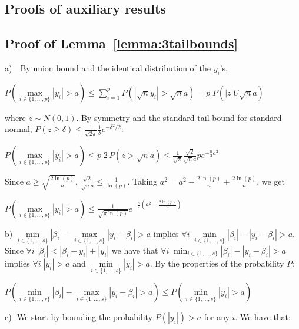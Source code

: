 \documentclass[aos]{imsart}
\theoremstyle{plain}
\begin{document}
\begin{supplement}
\section{Proofs of auxiliary results}\label{sec:proofauxi}

\subsection{Proof of Lemma~\ref{lemma:3tailbounds}}

	a) \,\, By union bound and the identical distribution of the $y_i$'s,
\begin{center}
    $P\left(\underset{i\in\{1,\ldots,p\}}{\max}|y_i|> a \right)     \leq \sum_{i=1}^{p}{ P\left(|\sqrt{n}y_i|>\sqrt{n}a \right)}
    = p\; P\left(|z|U\sqrt{n}a\right)$
\end{center}
    where $z\sim N(0,1)$. 
    By symmetry and the standard tail bound for standard normal, $P(z \geq \delta) \leq \frac{1}{\sqrt{2\pi}} \frac{1}{\delta} e^{-\delta^{2} / 2}$:
\begin{center}
  $P\left(\underset{i\in\{1,\ldots,p\}}{\max}|y_i|> a \right) 
     \leq  p\; 2 \, P\left(z>\sqrt{n}a\right) \leq \frac{1}{\sqrt{\pi}}\frac{\sqrt{2}}{\sqrt{n}a}p e^{-\frac{n}{2} a^{2}}$
\end{center}
Since $a \geq \sqrt{\frac{2\ln(p)}{n}}$, $\frac{\sqrt{2}}{\sqrt{n}a}\leq \frac{1}{\ln(p)}$. Taking $a^2=a^2-\frac{2\ln(p)}{n}+\frac{2\ln(p)}{n}$, we get \begin{center}
$ P\left(\underset{i\in\{1,\ldots,p\}}{\max}|y_i|> a \right) \leq \frac{1}{\sqrt{\pi\ln(p)}} e^{-\frac{n}{2} \left(a^{2}-\frac{2\ln(p)}{n}\right)}$ \\\end{center}
b) $ \underset{i \in \{1,\ldots,s\}}{\min}|\beta_i|- \underset{i \in \{1,\ldots,s\}}{\max}|y_i-\beta_i| > a$ implies $\forall i \; \underset{i \in \{1,\ldots,s\}}{\min}|\beta_i| - |y_i-\beta_i| > a $. Since $\forall i \; |\beta_i|< |\beta_i-y_i|+|y_i|$ we have that $ \forall i \; \min_{i \in \{1,\ldots,s\}}|\beta_i| - |y_i-\beta_i| > a$ implies $\forall i \; |y_i| > a $ and $ \underset{i \in \{1,\ldots,s\}}{\min}|y_i| > a$. By the properties of the probability $P$: 
\begin{center}$ P\left(\underset{i \in \{1,\ldots,s\}}{\min}|\beta_i|-\underset{i \in \{1,\ldots,s\}}{\max}|y_i-\beta_i| > a\right) \leq P\left(\underset{i \in \{1,\ldots,s\}}{\min}|y_i| > a\right) $ \end{center}
c)\,\, We start by bounding the probability $P(|y_i|)>a$ for any $i$. We have that:

\end{supplement}
\end{document}
